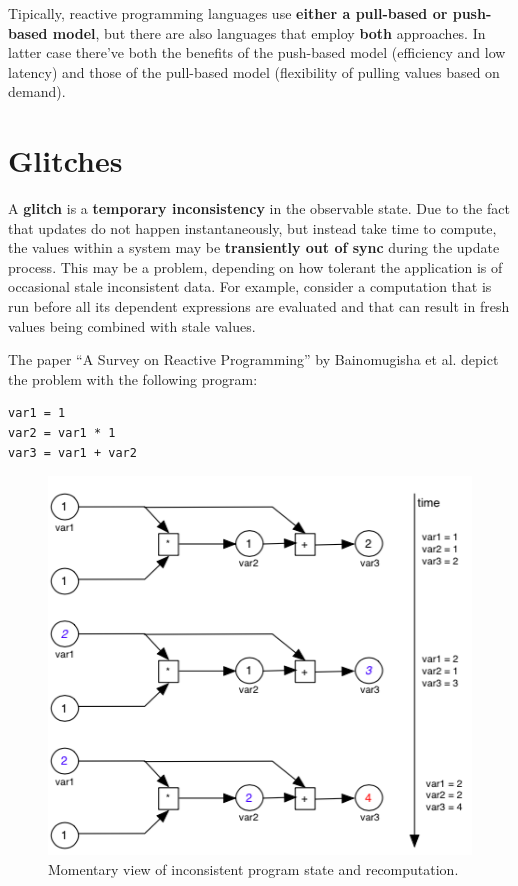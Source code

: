 Tipically, reactive programming languages use \textbf{either a
pull-based or push-based model}, but there are also languages that
employ \textbf{both} approaches. In latter case there've both the
benefits of the push-based model (efficiency and low latency) and those
of the pull-based model (flexibility of pulling values based on demand).

\section{Glitches}\label{glitches}

A \textbf{glitch} is a \textbf{temporary inconsistency} in the
observable state. Due to the fact that updates do not happen
instantaneously, but instead take time to compute, the values within a
system may be \textbf{transiently out of sync} during the update
process. This may be a problem, depending on how tolerant the
application is of occasional stale inconsistent data. For example,
consider a computation that is run before all its dependent expressions
are evaluated and that can result in fresh values being combined with
stale values.

The paper ``A Survey on Reactive Programming'' by Bainomugisha et al.
depict the problem with the following program:

\begin{verbatim}
var1 = 1
var2 = var1 * 1
var3 = var1 + var2
\end{verbatim}

\begin{figure}[htbp]
\centering
\includegraphics[scale=0.75]{imgs/glitches.png}
\caption{Momentary view of inconsistent program state and
recomputation.}
\end{figure}

